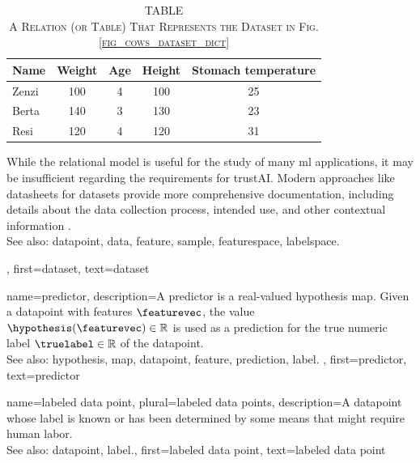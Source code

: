 {{		\begin{table}[H]
			\caption*{
				\centering 
				\scshape TABLE \thetable \\[0.5ex]
				\scshape A Relation (or Table) That Represents the Dataset in Fig. \ref{fig_cows_dataset_dict} 
			}
			\label{tab:cowdata_dict} 
			\centering
			\begin{tabular}{lcccc}
				\hline
				\textbf{Name} & \textbf{Weight} & \textbf{Age} & \textbf{Height} & \textbf{Stomach temperature} \\
				\hline
				Zenzi & 100 & 4 & 100 & 25 \\
				Berta & 140 & 3 & 130 & 23 \\
				Resi  & 120 & 4 & 120 & 31 \\
				\hline
			\end{tabular}
		\end{table}
 		While the relational \gls{model} is useful for the study of many \gls{ml} applications, 
		it may be insufficient regarding the requirements for \gls{trustAI}. Modern 
 		approaches like datasheets for datasets provide more comprehensive 
 		documentation, including details about the \gls{data} collection process, intended 
 		use, and other contextual information \cite{DatasheetData2021}.
 		\\
		See also: \gls{datapoint}, \gls{data}, \gls{feature}, \gls{sample}, \gls{featurespace}, \gls{labelspace}.},
	first={dataset},
	text={dataset}  
}

{name={predictor},
	description={A predictor is a real-valued \gls{hypothesis} \gls{map}. 
		Given a \gls{datapoint} with \glspl{feature} $\featurevec$, the value 
		$\hypothesis(\featurevec) \in \mathbb{R}$ is used as a \gls{prediction} for the true 
		numeric \gls{label} $\truelabel \in \mathbb{R}$ of the \gls{datapoint}.
				\\
		See also: \gls{hypothesis}, \gls{map}, \gls{datapoint}, \gls{feature}, \gls{prediction}, \gls{label}. },
	first={predictor},
	text={predictor}  
}

{name={labeled data point}, plural={labeled data points},
 	description={A \gls{datapoint} whose \gls{label} is known or has been determined 
 		by some means that might require human labor.
			\\
		See also: \gls{datapoint}, \gls{label}.},
 	first={labeled data point},
 	text={labeled data point}  
}

